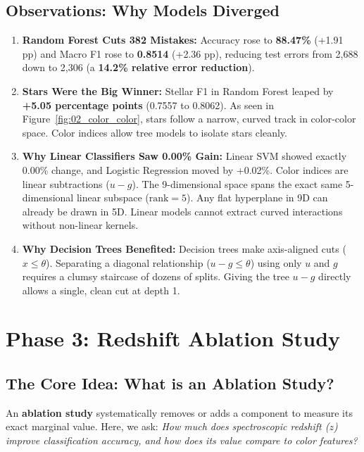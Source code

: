 \documentclass[11pt,a4paper]{article}
\begin{document}
\subsection{Observations: Why Models Diverged}
\begin{enumerate}[noitemsep]
    \item \textbf{Random Forest Cuts 382 Mistakes:} Accuracy rose to \textbf{88.47\%} (+1.91 pp) and Macro F1 rose to \textbf{0.8514} (+2.36 pp), reducing test errors from 2,688 down to 2,306 (a \textbf{14.2\% relative error reduction}).
    \item \textbf{Stars Were the Big Winner:} Stellar F1 in Random Forest leaped by \textbf{+5.05 percentage points} (0.7557 to 0.8062). As seen in Figure~\ref{fig:02_color_color}, stars follow a narrow, curved track in color-color space. Color indices allow tree models to isolate stars cleanly.
    \item \textbf{Why Linear Classifiers Saw 0.00\% Gain:} Linear SVM showed exactly 0.00\% change, and Logistic Regression moved by +0.02\%. Color indices are linear subtractions ($u - g$). The 9-dimensional space spans the exact same 5-dimensional linear subspace ($\text{rank} = 5$). Any flat hyperplane in 9D can already be drawn in 5D. Linear models cannot extract curved interactions without non-linear kernels.
    \item \textbf{Why Decision Trees Benefited:} Decision trees make axis-aligned cuts ($x \le \theta$). Separating a diagonal relationship ($u - g \le \theta$) using only $u$ and $g$ requires a clumsy staircase of dozens of splits. Giving the tree $u - g$ directly allows a single, clean cut at depth 1.
\end{enumerate}

\section{Phase 3: Redshift Ablation Study}

\subsection{The Core Idea: What is an Ablation Study?}
An \textbf{ablation study} systematically removes or adds a component to measure its exact marginal value. Here, we ask: \emph{How much does spectroscopic redshift ($z$) improve classification accuracy, and how does its value compare to color features?}
\end{document}
